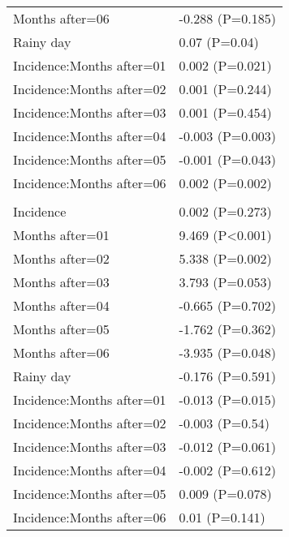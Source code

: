 \documentclass[]{article}
\begin{document}
\begin{longtable}[t]{ll}
\hspace{1em}Months after=06 & -0.288 (P=0.185)\\
\hspace{1em}Rainy day & 0.07 (P=0.04)\\
\hspace{1em}Incidence:Months after=01 & 0.002 (P=0.021)\\
\hspace{1em}Incidence:Months after=02 & 0.001 (P=0.244)\\
\hspace{1em}Incidence:Months after=03 & 0.001 (P=0.454)\\
\hspace{1em}Incidence:Months after=04 & -0.003 (P=0.003)\\
\hspace{1em}Incidence:Months after=05 & -0.001 (P=0.043)\\
\hspace{1em}Incidence:Months after=06 & 0.002 (P=0.002)\\
\addlinespace[1.5em]
\multicolumn{2}{l}{\textbf{Temporary not field worker}}\\
\hspace{1em}Incidence & 0.002 (P=0.273)\\
\hspace{1em}Months after=01 & 9.469 (P<0.001)\\
\hspace{1em}Months after=02 & 5.338 (P=0.002)\\
\hspace{1em}Months after=03 & 3.793 (P=0.053)\\
\hspace{1em}Months after=04 & -0.665 (P=0.702)\\
\hspace{1em}Months after=05 & -1.762 (P=0.362)\\
\hspace{1em}Months after=06 & -3.935 (P=0.048)\\
\hspace{1em}Rainy day & -0.176 (P=0.591)\\
\hspace{1em}Incidence:Months after=01 & -0.013 (P=0.015)\\
\hspace{1em}Incidence:Months after=02 & -0.003 (P=0.54)\\
\hspace{1em}Incidence:Months after=03 & -0.012 (P=0.061)\\
\hspace{1em}Incidence:Months after=04 & -0.002 (P=0.612)\\
\hspace{1em}Incidence:Months after=05 & 0.009 (P=0.078)\\
\hspace{1em}Incidence:Months after=06 & 0.01 (P=0.141)\\*
\end{longtable}
\end{document}

